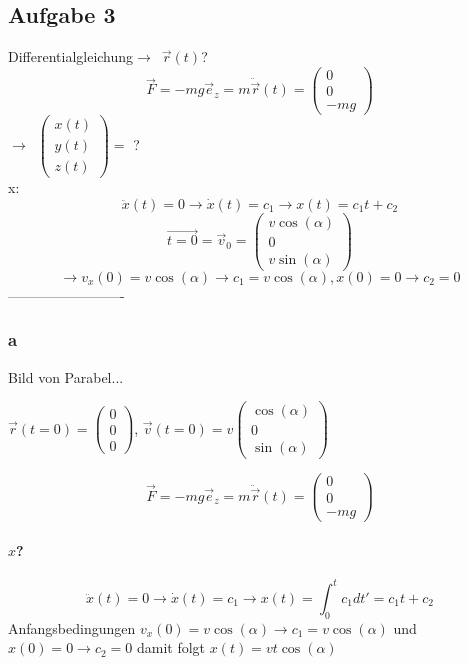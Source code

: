 \documentclass[oneside]{book}
\theoremstyle{definition}
\newcommand{\conseq}{$\rightarrow$~}
\newcommand{\Dgl}{Differentialgleichung}
\newcommand{\tvector}[1]{\begin{pmatrix}#1\end{pmatrix}}
\newcommand{\ddotvec}[1]{\ddot{\vec{#1}}}
\begin{document}
\subsection{Aufgabe 3}
\Dgl \conseq $\vec{r}(t)$?
$$\vec{F} = - m g \vec{e}_z = m \ddotvec{r} (t) = \begin{pmatrix}0\\ 0\\ - mg \end{pmatrix}$$
\conseq $\begin{pmatrix}x(t) \\ y(t) \\ z(t)\end{pmatrix} = $ ?\\
x: 
$$\ddot{x}(t) = 0 \rightarrow \dot{x}(t) = c_1 \rightarrow x(t) = c_1 t + c_2$$
$$\vec{t = 0} = \vec{v}_0 = \begin{pmatrix}v \cos(\alpha) \\ 0 \\ v \sin(\alpha)\end{pmatrix}$$
$$\rightarrow v_x(0) = v \cos(\alpha) \rightarrow c_1 = v \cos(\alpha), x(0) = 0 \rightarrow c_2 = 0$$
-------------------------

\subsubsection{a}
Bild von Parabel...

$\vec{r}(t =0) = \begin{pmatrix}0\\0\\0\end{pmatrix}$, $\vec{v}(t = 0)=v \tvector{\cos(\alpha) \\0 \\ \sin(\alpha)}$

$$\vec{F} = - m g \vec{e}_z = m \ddotvec{r} (t) = \begin{pmatrix}0\\ 0\\ - mg \end{pmatrix}$$

\paragraph{$x$?}
$$\ddot{x}(t) = 0 \rightarrow \dot{x}(t) = c_1 \rightarrow x(t) = \int_0^t c_1 dt' = c_1 t + c_2$$
Anfangsbedingungen $v_x(0) = v \cos(\alpha) \rightarrow c_1 = v \cos(\alpha)$ und $x(0) = 0 \rightarrow c_2 = 0$ damit folgt $x(t) = v t \cos(\alpha)$
\end{document}
